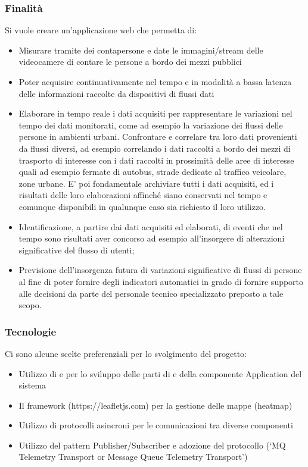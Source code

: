 \documentclass[]{article}
\begin{document}
		\subsubsection{Finalità}
		
		Si vuole creare un’applicazione web che permetta di:
		\begin{itemize}		
		\item \textsc Misurare tramite dei contapersone e date le immagini/stream delle videocamere di contare le persone a bordo dei mezzi pubblici
		\item \textsc Poter acquisire continuativamente nel tempo e in modalità a bassa latenza delle informazioni raccolte da dispositivi di flussi dati	
		\item \textsc Elaborare in tempo reale i dati acquisiti per rappresentare le variazioni nel tempo dei dati monitorati, come ad esempio la variazione dei flussi delle persone in ambienti urbani. Confrontare e correlare tra loro dati provenienti da flussi diversi, ad esempio correlando i dati raccolti a bordo dei mezzi di trasporto di interesse con i dati raccolti in prossimità delle aree di interesse quali ad esempio fermate di autobus, strade dedicate al traffico veicolare, zone urbane. E' poi fondamentale archiviare tutti i dati acquisiti, ed i risultati delle loro elaborazioni affinché siano conservati nel tempo e comunque disponibili in qualunque caso sia richiesto il loro utilizzo. 
		\item \textsc Identificazione, a partire dai dati acquisiti ed elaborati, di eventi che nel tempo sono risultati aver concorso ad esempio all’insorgere di alterazioni significative del flusso di utenti;
		\item \textsc Previsione dell’insorgenza futura di variazioni significative di flussi di persone al fine di poter fornire degli indicatori automatici in grado di fornire supporto alle decisioni da parte del personale tecnico specializzato preposto a tale scopo.
		\end{itemize}
		 	
		\subsubsection{Tecnologie}
		Ci sono alcune scelte preferenziali per lo svolgimento del progetto:
		\begin{itemize}		
		\item \textsc Utilizzo di  e  per lo sviluppo delle parti di  e  della componente Application del sistema
		\item \textsc Il framework  (https://leafletjs.com) per la gestione delle mappe (heatmap)
		\item \textsc Utilizzo di protocolli asincroni per le comunicazioni tra diverse componenti
		\item \textsc Utilizzo del pattern Publisher/Subscriber e adozione del protocollo (‘MQ Telemetry Transport or Message Queue Telemetry Transport’)
		\end{itemize}
		
\end{document}
